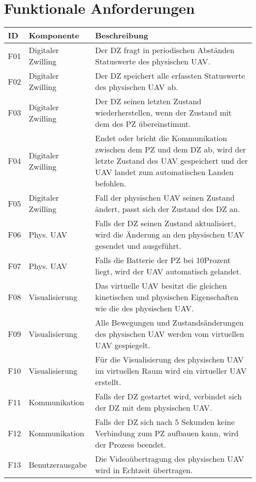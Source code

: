 \section{Funktionale Anforderungen}

\renewcommand{\arraystretch}{1.4}
\begin{table}[H]
\begin{tabular}{ p{0.5cm} p{3cm} p{11cm}}
    ID & Komponente & Beschreibung  \\
    \hline
    F01 & Digitaler Zwilling & Der DZ fragt in periodischen Abständen Statuswerte des physischen UAV. \\
    F02 & Digitaler Zwilling & Der DZ speichert alle erfassten Statuswerte des physischen UAV ab. \\
    F03 & Digitaler Zwilling & Der DZ seinen letzten Zustand wiederherstellen, wenn der Zustand mit dem des PZ übereinstimmt. \\
    F04 & Digitaler Zwilling & Endet oder bricht die Kommunikation zwischen dem PZ und dem DZ ab, wird der letzte Zustand des UAV gespeichert und der UAV landet zum automatischen Landen befohlen. \\
    F05 & Digitaler Zwilling & Fall der physischen UAV seinen Zustand ändert, passt sich der Zustand des DZ an. \\
    F06 & Phys. UAV & Falls der DZ seinen Zustand aktualisiert, wird die Änderung an den physischen UAV gesendet und ausgeführt. \\
    F07 & Phys. UAV & Falls die Batterie der PZ bei 10Prozent liegt, wird der UAV automatisch gelandet. \\
    F08 & Visualisierung & Das virtuelle UAV besitzt die gleichen kinetischen und physischen Eigenschaften wie die des physischen UAV. \\
    F09 & Visualisierung & Alle Bewegungen und Zustandsänderungen des physischen UAV werden vom virtuellen UAV gespiegelt. \\
    F10 & Visualisierung & Für die Visualisierung des physischen UAV im virtuellen Raum wird ein virtueller UAV erstellt. \\
    F11 & Kommunikation & Falls der DZ gestartet wird, verbindet sich der DZ mit dem physischen UAV. \\
    F12 & Kommunikation & Falls der DZ sich nach 5 Sekunden keine Verbindung zum PZ aufbauen kann, wird der Prozess beendet. \\
    F13 & Benutzerausgabe & Die Videoübertragung des physischen UAV wird in Echtzeit übertragen. \\

\end{tabular}
\end{table}
